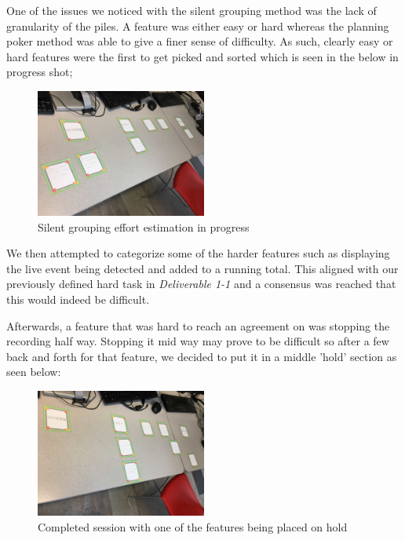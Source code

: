\documentclass[11pt,a4paper]{article}
\begin{document}
\newpage

One of the issues we noticed with the silent grouping method was the lack of granularity of the piles. A feature was either easy or hard whereas the planning poker method was able to give a finer sense of difficulty. As such, clearly easy or hard features were the first to get picked and sorted which is seen in the below in progress shot; 

\begin{figure}[h]
	\centering
	\includegraphics[width=0.5\textwidth]{silentimg2.png}
	\caption{Silent grouping effort estimation in progress}
	\end{figure}

We then attempted to categorize some of the harder features such as displaying the live event being detected and added to a running total. This aligned with our previously defined hard task in \textit{Deliverable 1-1} and a consensus was reached that this would indeed be difficult. 

Afterwards, a feature that was hard to reach an agreement on was stopping the recording half way. Stopping it mid way may prove to be difficult so after a few back and forth for that feature, we decided to put it in a middle 'hold' section as seen below:

\begin{figure}[h]
	\centering
	\includegraphics[width=0.5\textwidth]{silentimg3.png}
	\caption{Completed session with one of the features being placed on hold}
	\end{figure}
	
\end{document}
